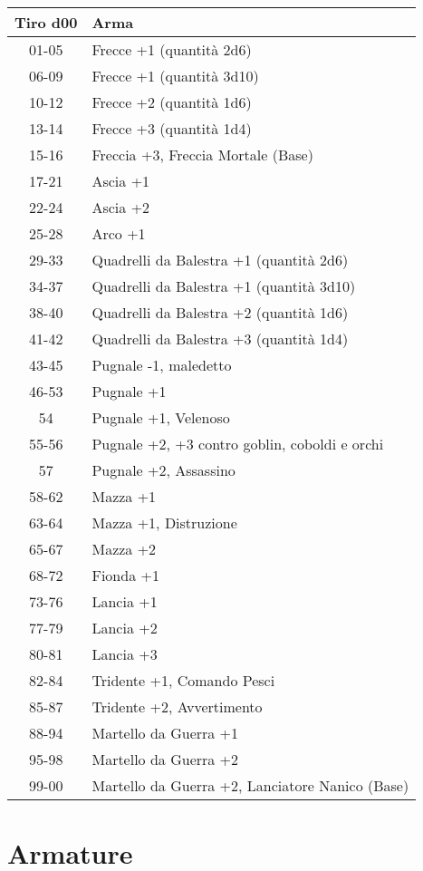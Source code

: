 \documentclass{article}
\begin{document}
\begin{multicols}{2}
\begin{tabular}{|c|l|}
\hline
\textbf{Tiro d00} & \textbf{Arma} \\
\hline
01-05 & Frecce +1 (quantità 2d6) \\
06-09 & Frecce +1 (quantità 3d10) \\
10-12 & Frecce +2 (quantità 1d6) \\
13-14 & Frecce +3 (quantità 1d4) \\
15-16 & Freccia +3, Freccia Mortale (Base) \\
17-21 & Ascia +1 \\
22-24 & Ascia +2 \\
25-28 & Arco +1 \\
29-33 & Quadrelli da Balestra +1 (quantità 2d6) \\
34-37 & Quadrelli da Balestra +1 (quantità 3d10) \\
38-40 & Quadrelli da Balestra +2 (quantità 1d6) \\
41-42 & Quadrelli da Balestra +3 (quantità 1d4) \\
43-45 & Pugnale -1, maledetto \\
46-53 & Pugnale +1 \\
54 & Pugnale +1, Velenoso \\
55-56 & Pugnale +2, +3 contro goblin, coboldi e orchi \\
57 & Pugnale +2, Assassino \\
58-62 & Mazza +1 \\
63-64 & Mazza +1, Distruzione \\
65-67 & Mazza +2 \\
68-72 & Fionda +1 \\
73-76 & Lancia +1 \\
77-79 & Lancia +2 \\
80-81 & Lancia +3 \\
82-84 & Tridente +1, Comando Pesci \\
85-87 & Tridente +2, Avvertimento \\
88-94 & Martello da Guerra +1 \\
95-98 & Martello da Guerra +2 \\
99-00 & Martello da Guerra +2, Lanciatore Nanico (Base) \\
\hline

\end{tabular}

\section{Armature}


\end{multicols}
\end{document}
